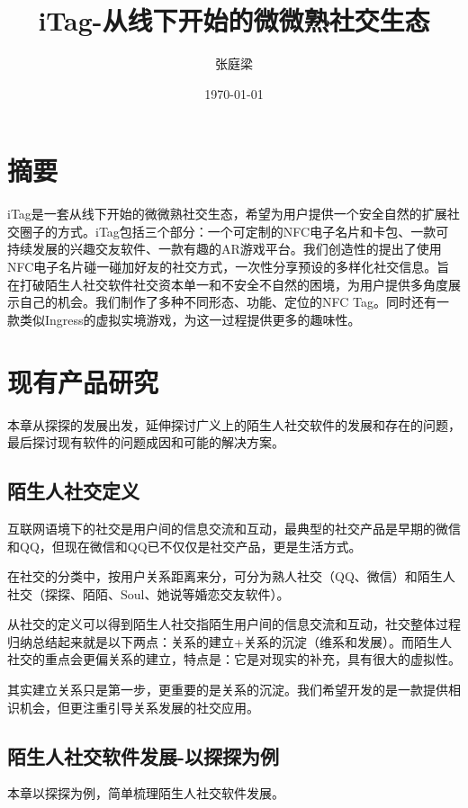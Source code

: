 \documentclass[UTF8]{ctexart}
\title{iTag-从线下开始的微微熟社交生态}
\author{张庭梁}
\date{\today}
\begin{document}
\maketitle

\section{摘要}

iTag是一套从线下开始的微微熟社交生态，希望为用户提供一个安全自然的扩展社交圈子的方式。iTag包括三个部分：一个可定制的NFC电子名片和卡包、一款可持续发展的兴趣交友软件、一款有趣的AR游戏平台。我们创造性的提出了使用NFC电子名片碰一碰加好友的社交方式，一次性分享预设的多样化社交信息。旨在打破陌生人社交软件社交资本单一和不安全不自然的困境，为用户提供多角度展示自己的机会。我们制作了多种不同形态、功能、定位的NFC Tag。同时还有一款类似Ingress的虚拟实境游戏，为这一过程提供更多的趣味性。

\section{现有产品研究}
本章从探探的发展出发，延伸探讨广义上的陌生人社交软件的发展和存在的问题，最后探讨现有软件的问题成因和可能的解决方案。

\subsection{陌生人社交定义}

\begin{tcolorbox}
    互联网语境下的社交是用户间的信息交流和互动，最典型的社交产品是早期的微信和QQ，但现在微信和QQ已不仅仅是社交产品，更是生活方式。

    在社交的分类中，按用户关系距离来分，可分为熟人社交（QQ、微信）和陌生人社交（探探、陌陌、Soul、她说等婚恋交友软件）。

    从社交的定义可以得到陌生人社交指陌生用户间的信息交流和互动，社交整体过程归纳总结起来就是以下两点：关系的建立+关系的沉淀（维系和发展）。而陌生人社交的重点会更偏关系的建立，特点是：它是对现实的补充，具有很大的虚拟性。\cite{StrangerDefine}
\end{tcolorbox}

其实建立关系只是第一步，更重要的是关系的沉淀。我们希望开发的是一款提供相识机会，但更注重引导关系发展的社交应用。

\subsection{陌生人社交软件发展-以探探为例}
本章以探探为例，简单梳理陌生人社交软件发展。
\end{document}
